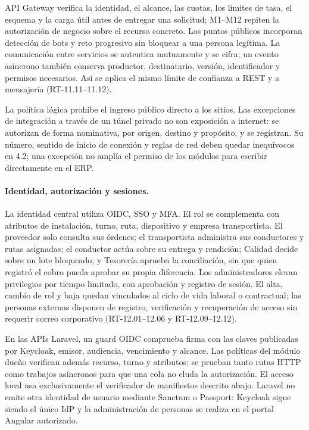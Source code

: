 API Gateway verifica la identidad, el alcance, las cuotas, los límites de tasa, el esquema y la carga útil antes de entregar una solicitud; M1--M12 repiten la autorización de negocio sobre el recurso concreto. Los puntos públicos incorporan detección de bots y reto progresivo sin bloquear a una persona legítima. La comunicación entre servicios se autentica mutuamente y se cifra; un evento asíncrono también conserva productor, destinatario, versión, identificador y permisos necesarios. Así se aplica el mismo límite de confianza a REST y a mensajería (RT-11.11--11.12).

La política lógica prohíbe el ingreso público directo a los sitios. Las excepciones de integración a través de un túnel privado no son exposición a internet: se autorizan de forma nominativa, por origen, destino y propósito, y se registran. Su número, sentido de inicio de conexión y reglas de red deben quedar inequívocos en 4.2; una excepción no amplía el permiso de los módulos para escribir directamente en el ERP.

\paragraph{Identidad, autorización y sesiones.}
La identidad central utiliza OIDC, SSO y MFA. El rol se complementa con atributos de instalación, turno, ruta, dispositivo y empresa transportista. El proveedor solo consulta sus órdenes; el transportista administra sus conductores y rutas asignadas; el conductor actúa sobre su entrega y rendición; Calidad decide sobre un lote bloqueado; y Tesorería aprueba la conciliación, sin que quien registró el cobro pueda aprobar su propia diferencia. Los administradores elevan privilegios por tiempo limitado, con aprobación y registro de sesión. El alta, cambio de rol y baja quedan vinculados al ciclo de vida laboral o contractual; las personas externas disponen de registro, verificación y recuperación de acceso sin requerir correo corporativo (RT-12.01--12.06 y RT-12.09--12.12).

En las APIs Laravel, un guard OIDC comprueba firma con las claves publicadas por Keycloak, emisor, audiencia, vencimiento y alcance. Las políticas del módulo dueño verifican además recurso, turno y atributos; se prueban tanto rutas HTTP como trabajos asíncronos para que una cola no eluda la autorización. El acceso local usa exclusivamente el verificador de manifiestos descrito abajo. Laravel no emite otra identidad de usuario mediante Sanctum o Passport: Keycloak sigue siendo el único IdP y la administración de personas se realiza en el portal Angular autorizado.

